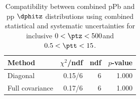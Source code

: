 \begin{table}[htp!]
\centering
\begin{tabular}{|l|r|r|r|}
\hline
Method & $\chi^2$/ndf & ndf & $p$-value \\
\hline
Diagonal & 0.15/6 & 6 & 1.000 \\
Full covariance & 0.17/6 & 6 & 1.000 \\
\hline
\end{tabular}
\caption{Compatibility between combined pPb and pp $\dphitz$ distributions using combined statistical and systematic uncertainties for inclusive $0 < \ptz < 500$\GeV and $0.5 < \ptt < 15$\GeV.}
\label{table:chisq_dphi}
\end{table}
